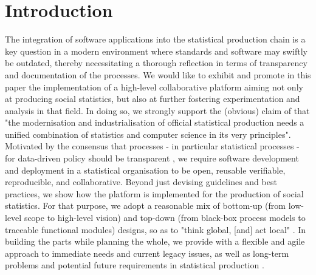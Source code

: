 \section{Introduction}

The integration of software applications into the statistical production chain is a key question in a modern environment where standards and software may swiftly be outdated, thereby necessitating a thorough reflection in terms of transparency and documentation of the processes. We would like to exhibit and promote in this paper the implementation of a high-level collaborative platform aiming not only at producing social statistics, but also at further fostering experimentation and analysis in that field. In doing so, we strongly support the (obvious) claim of \cite{salgado2016modern} that "the modernisation and industrialisation of official statistical production needs a unified combination of statistics and computer science in its very principles".
\\
Motivated by the consensus that processes - in particular statistical processes \cite{sutherland2013twenty} - for data-driven policy should be transparent \cite{bertot2014big}, we require software development and deployment in a statistical organisation to be open, reusable verifiable, reproducible, and collaborative. Beyond just devising guidelines and best practices, we show how the platform is implemented for the production of social statistics. For that purpose, we adopt a reasonable mix of bottom-up (from low-level scope to high-level vision) and top-down (from black-box process models to traceable functional modules) designs, so as to "think global, [and] act local" \cite{lalor2013modernising}. In building the parts while planning the whole, we provide with a flexible and agile approach to immediate needs and current legacy issues, as well as long-term problems and potential future requirements in statistical production \cite{UNECE2015common}.

